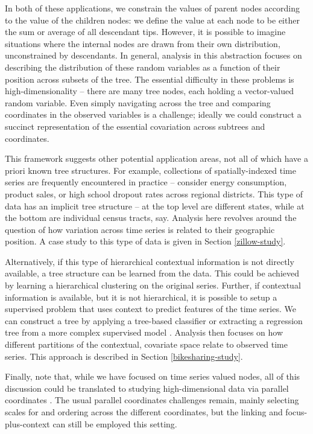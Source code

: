 \documentclass[12pt]{article}
\begin{document}
In both of these applications, we constrain the values of parent nodes
according to the value of the children nodes: we define the value at
each node to be either the sum or average of all descendant tips.
However, it is possible to imagine situations where the internal nodes
are drawn from their own distribution, unconstrained by descendants. In
general, analysis in this abstraction focuses on describing the
distribution of these random variables as a function of their position
across subsets of the tree. The essential difficulty in these problems
is high-dimensionality -- there are many tree nodes, each holding a
vector-valued random variable. Even simply navigating across the tree
and comparing coordinates in the observed variables is a challenge;
ideally we could construct a succinct representation of the essential
covariation across subtrees and coordinates.

This framework suggests other potential application areas, not all of
which have a priori known tree structures. For example, collections of
spatially-indexed time series are frequently encountered in practice --
consider energy consumption, product sales, or high school dropout rates
across regional districts. This type of data has an implicit tree
structure -- at the top level are different states, while at the bottom
are individual census tracts, say. Analysis here revolves around the
question of how variation across time series is related to their
geographic position. A case study to this type of data is given in
Section \ref{zillow-study}.

Alternatively, if this type of hierarchical contextual information is
not directly available, a tree structure can be learned from the data.
This could be achieved by learning a hierarchical clustering on the
original series. Further, if contextual information is available, but it
is not hierarchical, it is possible to setup a supervised problem that
uses context to predict features of the time series. We can construct a tree by
applying a tree-based classifier \citep{breiman1984classification} or extracting
a regression tree from a more complex supervised model
\citep{boz2002extracting,saito2002extracting}. Analysis then focuses on how
different partitions of the contextual, covariate space relate to observed time
series. This approach is described in Section \ref{bikesharing-study}.

Finally, note that, while we have focused on time series valued nodes,
all of this discussion could be translated to studying high-dimensional
data via parallel coordinates \citep{inselberg1991parallel}. The usual parallel
coordinates challenges remain, mainly selecting scales for and ordering
across the different coordinates, but the linking and focus-plus-context
can still be employed this setting.
\end{document}
